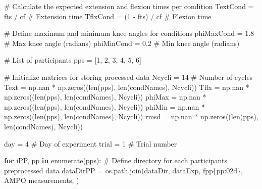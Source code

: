\documentclass[
  11pt,
  a4paper]{article}
\newenvironment{Shaded}{\begin{snugshade}}{\end{snugshade}}
\newcommand{\BuiltInTok}[1]{\textcolor[rgb]{0.00,0.23,0.31}{#1}}
\newcommand{\CommentTok}[1]{\textcolor[rgb]{0.37,0.37,0.37}{#1}}
\newcommand{\ControlFlowTok}[1]{\textcolor[rgb]{0.00,0.23,0.31}{\textbf{#1}}}
\newcommand{\DecValTok}[1]{\textcolor[rgb]{0.68,0.00,0.00}{#1}}
\newcommand{\FloatTok}[1]{\textcolor[rgb]{0.68,0.00,0.00}{#1}}
\newcommand{\KeywordTok}[1]{\textcolor[rgb]{0.00,0.23,0.31}{\textbf{#1}}}
\newcommand{\NormalTok}[1]{\textcolor[rgb]{0.00,0.23,0.31}{#1}}
\newcommand{\OperatorTok}[1]{\textcolor[rgb]{0.37,0.37,0.37}{#1}}
\newcommand{\SpecialCharTok}[1]{\textcolor[rgb]{0.37,0.37,0.37}{#1}}
\newcommand{\SpecialStringTok}[1]{\textcolor[rgb]{0.13,0.47,0.30}{#1}}
\newcommand{\StringTok}[1]{\textcolor[rgb]{0.13,0.47,0.30}{#1}}
\begin{document}
\begin{Shaded}
\begin{Highlighting}[]
\CommentTok{\# Calculate the expected extension and flexion times per condition}
\NormalTok{TextCond }\OperatorTok{=}\NormalTok{ fts }\OperatorTok{/}\NormalTok{ cf  }\CommentTok{\# Extension time}
\NormalTok{TflxCond }\OperatorTok{=}\NormalTok{ (}\DecValTok{1} \OperatorTok{{-}}\NormalTok{ fts) }\OperatorTok{/}\NormalTok{ cf  }\CommentTok{\# Flexion time}

\CommentTok{\# Define maximum and minimum knee angles for conditions}
\NormalTok{phiMaxCond }\OperatorTok{=} \FloatTok{1.8}  \CommentTok{\# Max knee angle (radians)}
\NormalTok{phiMinCond }\OperatorTok{=} \FloatTok{0.2}  \CommentTok{\# Min knee angle (radians)}

\CommentTok{\# List of participants}
\NormalTok{pps }\OperatorTok{=}\NormalTok{ [}\DecValTok{1}\NormalTok{, }\DecValTok{2}\NormalTok{, }\DecValTok{3}\NormalTok{, }\DecValTok{4}\NormalTok{, }\DecValTok{5}\NormalTok{, }\DecValTok{6}\NormalTok{]}

\CommentTok{\# Initialize matrices for storing processed data}
\NormalTok{Ncycli }\OperatorTok{=} \DecValTok{14}  \CommentTok{\# Number of cycles}
\NormalTok{Text }\OperatorTok{=}\NormalTok{ np.nan }\OperatorTok{*}\NormalTok{ np.zeros((}\BuiltInTok{len}\NormalTok{(pps), }\BuiltInTok{len}\NormalTok{(condNames), Ncycli))}
\NormalTok{Tflx }\OperatorTok{=}\NormalTok{ np.nan }\OperatorTok{*}\NormalTok{ np.zeros((}\BuiltInTok{len}\NormalTok{(pps), }\BuiltInTok{len}\NormalTok{(condNames), Ncycli))}
\NormalTok{phiMax }\OperatorTok{=}\NormalTok{ np.nan }\OperatorTok{*}\NormalTok{ np.zeros((}\BuiltInTok{len}\NormalTok{(pps), }\BuiltInTok{len}\NormalTok{(condNames), Ncycli))}
\NormalTok{phiMin }\OperatorTok{=}\NormalTok{ np.nan }\OperatorTok{*}\NormalTok{ np.zeros((}\BuiltInTok{len}\NormalTok{(pps), }\BuiltInTok{len}\NormalTok{(condNames), Ncycli))}
\NormalTok{rmsd }\OperatorTok{=}\NormalTok{ np.nan }\OperatorTok{*}\NormalTok{ np.zeros((}\BuiltInTok{len}\NormalTok{(pps), }\BuiltInTok{len}\NormalTok{(condNames), Ncycli))}

\NormalTok{day }\OperatorTok{=} \DecValTok{4}  \CommentTok{\# Day of experiment}
\NormalTok{trial }\OperatorTok{=} \DecValTok{1}  \CommentTok{\# Trial number}

\ControlFlowTok{for}\NormalTok{ iPP, pp }\KeywordTok{in} \BuiltInTok{enumerate}\NormalTok{(pps):}
    \CommentTok{\# Define directory for each participant\textquotesingle{}s preprocessed data}
\NormalTok{    dataDirPP }\OperatorTok{=}\NormalTok{ os.path.join(dataDir, }\StringTok{\textquotesingle{}dataExp\textquotesingle{}}\NormalTok{, }\SpecialStringTok{f\textquotesingle{}pp}\SpecialCharTok{\{}\NormalTok{pp}\SpecialCharTok{:02d\}}\SpecialStringTok{\textquotesingle{}}\NormalTok{, }\StringTok{\textquotesingle{}AMPO measurements\textquotesingle{}}\NormalTok{, }\StringTok{\textquotesingle{}\textquotesingle{}}\NormalTok{)}
    

\end{Highlighting}
\end{Shaded}
\end{document}
